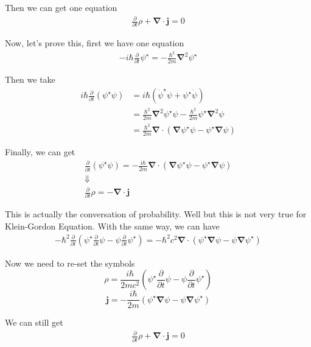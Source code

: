 Then we can get one equation 
\begin{align*}
	\boxed{\frac{\partial}{\partial t}\rho+\pmb{\nabla\cdot j}=0}
\end{align*}

Now, let's prove this, first we have one equation
\begin{align*}
	-i\hbar \frac{\partial}{\partial t}\psi^\star=-\frac{\hbar^2}{2m}\pmb{\nabla}^2\psi^\star
\end{align*}

Then we take 
\begin{align*}
	i\hbar \frac{\partial}{\partial t}(\psi^\star \psi)&=i\hbar (\dot{\psi}^\star\psi+\psi^\star \dot{\psi})\\
	&=\frac{\hbar^2}{2m}\pmb{\nabla}^2 \psi^\star \psi-\frac{\hbar^2}{2m}\psi^\star \pmb{\nabla}^2\psi\\
	&=\frac{\hbar^2}{2m}\pmb{\nabla}\cdot(\pmb{\nabla}\psi^\star \psi-\psi^\star \pmb{\nabla}\psi)
\end{align*}

Finally, we can get 
\begin{gather*}
	\frac{\partial}{\partial t}(\psi^\star \psi)=-\frac{i \hbar}{2m}\pmb{\nabla}\cdot (\pmb{\nabla}\psi^\star \psi-\psi^\star \pmb{\nabla}\psi)\\
	\Downarrow\\
	\frac{\partial}{\partial t}\rho=-\pmb{\nabla}\cdot \pmb{j}
\end{gather*}

This is actually the conversation of probability. Well but this is not very true for Klein-Gordon Equation. With the same way, we can have 
\begin{align*}
	-\hbar^2 \frac{\partial}{\partial t}(\psi^\star \frac{\partial}{\partial t}\psi-\psi \frac{\partial}{\partial t}\psi^\star)=-\hbar^2 c^2 \pmb{\nabla}\cdot(\psi^\star \pmb{\nabla}\psi-\psi \pmb{\nabla}\psi^\star)
\end{align*}

Now we need to re-set the symbols
$$\rho=\frac{i\hbar}{2mc^2} (\psi^\star \frac{\partial}{\partial t}\psi-\psi \frac{\partial}{\partial t}\psi^\star)$$
$$\pmb{j}=-\frac{i\hbar}{2m}(\psi^\star \pmb{\nabla}\psi-\psi \pmb{\nabla}\psi^\star)$$

We can still get 
\begin{align*}
	\frac{\partial}{\partial	t}\rho+\pmb{\nabla}\cdot \pmb{j}=0
\end{align*}




